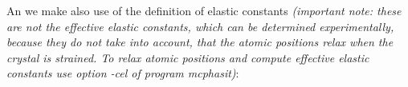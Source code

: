




An we make also use of the definition of elastic constants {\em (important note: these
are not the effective elastic constants, which can be determined experimentally, because
they do not take into account, that the atomic positions relax when the crystal is 
strained. To relax atomic positions and compute effective elastic constants use
option -cel of program {\prg mcphasit})}:

